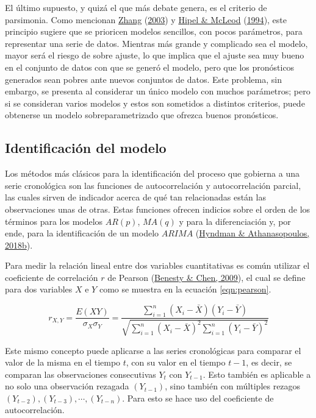 \documentclass[
]{article}
\begin{document}
El último supuesto, y quizá el que más debate genera, es el criterio de
parsimonia. Como mencionan \protect\hyperlink{ref-Zhang}{Zhang}
(\protect\hyperlink{ref-Zhang}{2003}) y
\protect\hyperlink{ref-Hipel}{Hipel \& McLeod}
(\protect\hyperlink{ref-Hipel}{1994}), este principio sugiere que se
prioricen modelos sencillos, con pocos parámetros, para representar una
serie de datos. Mientras más grande y complicado sea el modelo, mayor
será el riesgo de sobre ajuste, lo que implica que el ajuste sea muy
bueno en el conjunto de datos con que se generó el modelo, pero que los
pronósticos generados sean pobres ante nuevos conjuntos de datos. Este
problema, sin embargo, se presenta al considerar un único modelo con
muchos parámetros; pero si se consideran varios modelos y estos son
sometidos a distintos criterios, puede obtenerse un modelo
sobreparametrizado que ofrezca buenos pronósticos.

\subsection{Identificación del modelo}

Los métodos más clásicos para la identificación del proceso que gobierna
a una serie cronológica son las funciones de autocorrelación y
autocorrelación parcial, las cuales sirven de indicador acerca de qué
tan relacionadas están las observaciones unas de otras. Estas funciones
ofrecen indicios sobre el orden de los términos para los modelos
\(AR(p)\), \(MA(q)\) y para la diferenciación y, por ende, para la
identificación de un modelo \(ARIMA\)
(\protect\hyperlink{ref-hyndman_box-jenkins}{Hyndman \& Athanasopoulos,
2018b}).

Para medir la relación lineal entre dos variables cuantitativas es común
utilizar el coeficiente de correlación \(r\) de Pearson
(\protect\hyperlink{ref-pearson}{Benesty \& Chen, 2009}), el cual se
define para dos variables \(X\) e \(Y\) como se muestra en la ecuación
\ref{eqn:pearson}.

\begin{equation}
\label{eqn:pearson}
r_{X,Y}=\frac{E(XY)}{\sigma_X \sigma_Y} = \frac{\sum_{i=1}^n \left(X_i- \bar X\right) \left(Y_i- \bar Y\right)}{\sqrt{\sum_{i=1}^n \left(X_i- \bar X\right)^2 \sum_{i=1}^n \left(Y_i- \bar Y\right)^2}}
\end{equation}

Este mismo concepto puede aplicarse a las series cronológicas para
comparar el valor de la misma en el tiempo \(t\), con su valor en el
tiempo \(t-1\), es decir, se comparan las observaciones consecutivas
\(Y_t\) con \(Y_{t-1}\). Esto también es aplicable a no solo una
observación rezagada \((Y_{t-1})\), sino también con múltiples rezagos
\((Y_{t-2}), (Y_{t-3}), \cdots,(Y_{t-n})\). Para esto se hace uso del
coeficiente de autocorrelación.
\end{document}
